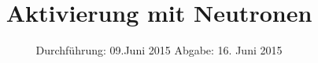 
\subject{Anfängerpraktikum V702}
\title{Aktivierung mit Neutronen }
\date{
  Durchführung: 09.Juni 2015
  \hspace{3em}
  Abgabe: 16. Juni 2015
}


\maketitle
\thispagestyle{empty}
\newpage





\nocite{skript}
\printbibliography

